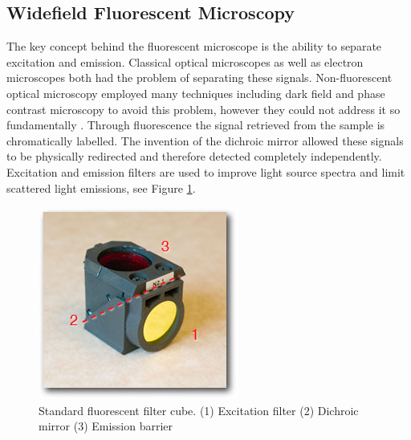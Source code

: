 \subsection{Widefield Fluorescent  Microscopy}

The key concept behind the fluorescent microscope is the ability to separate excitation and emission. Classical optical microscopes as well as electron microscopes both had the %
problem of separating these signals. Non-fluorescent optical microscopy employed many techniques including dark field and phase contrast microscopy to avoid this problem, however they could not address it so fundamentally \cite{Murphy2012e}. Through fluorescence the signal retrieved from the sample is chromatically labelled. %
The invention of the dichroic mirror allowed these signals to be physically redirected and therefore detected completely independently. Excitation and emission filters are used to improve light source spectra and limit scattered light emissions, see Figure \ref{fig:filtercube}.




\begin{figure}
	\centering
	\includegraphics[width=0.3\linewidth]{filtercube}
	\caption[Fluorescent filter cube]{Standard fluorescent filter cube. (1) Excitation filter (2) Dichroic mirror (3) Emission barrier}
	\label{fig:filtercube}
\end{figure}
